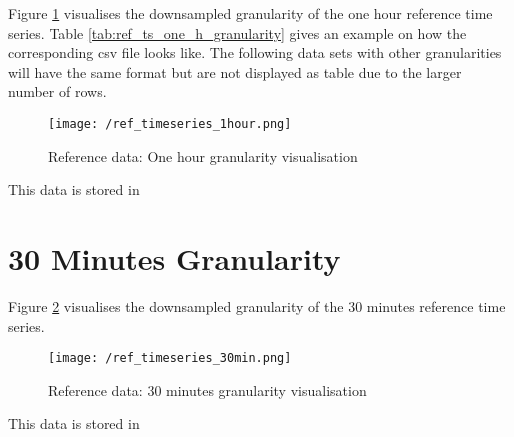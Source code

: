 Figure \ref{fig:ref_ts_one_h_granularity} visualises the downsampled granularity of the one hour reference time series.
Table \ref{tab:ref_ts_one_h_granularity} gives an example on how the corresponding csv file looks like. The following data sets with other granularities will have the same format but are not displayed as table due to the larger number of rows.

\begin{figure}[h!]
	\texttt{[image: /ref\_timeseries\_1hour.png]}
	\caption{Reference data: One hour granularity visualisation}
	\label{fig:ref_ts_one_h_granularity}
\end{figure}

\clearpage

\begin{table}[h!]
\centering
{}
\caption{Reference data: One hour granularity data}
\label{tab:ref_ts_one_h_granularity}
\end{table}

This data is stored in 


\clearpage
\section{30 Minutes Granularity}

Figure \ref{fig:ref_ts_30_m_granularity} visualises the downsampled granularity of the 30 minutes reference time series.

\begin{figure}[h!]
	\texttt{[image: /ref\_timeseries\_30min.png]}
	\caption{Reference data: 30 minutes granularity visualisation}
	\label{fig:ref_ts_30_m_granularity}
\end{figure}

This data is stored in 



